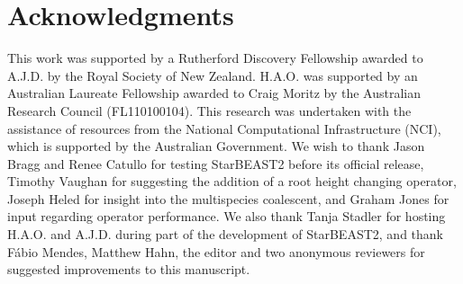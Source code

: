\documentclass[12pt]{article}
\begin{document}
\section{Acknowledgments}

This work was supported by a Rutherford Discovery Fellowship awarded to A.J.D.
by the Royal Society of New Zealand. H.A.O. was supported by an Australian
Laureate Fellowship awarded to Craig Moritz by the Australian Research Council
(FL110100104). This research was undertaken with the assistance of resources
from the National Computational Infrastructure (NCI), which is supported by
the Australian Government. We wish to thank Jason Bragg and Renee Catullo for
testing StarBEAST2 before its official release, Timothy Vaughan for suggesting
the addition of a root height changing operator, Joseph Heled for insight into
the multispecies coalescent, and Graham Jones for input regarding operator
performance. We also thank Tanja Stadler for hosting H.A.O. and A.J.D. during
part of the development of StarBEAST2, and thank F\'abio Mendes, Matthew Hahn,
the editor and two anonymous reviewers for suggested improvements to this
manuscript.



\end{document}
